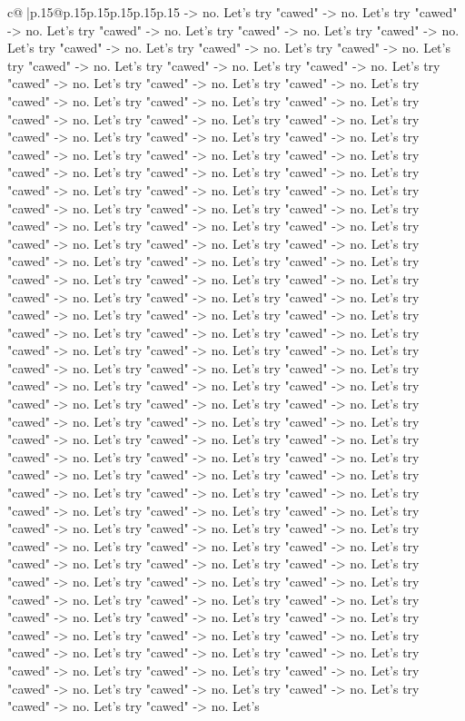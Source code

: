 \documentclass{article}
\begin{document}
{\begin{supertabular}{c@{$\;$}|p{.15\linewidth}@{}p{.15\linewidth}p{.15\linewidth}p{.15\linewidth}p{.15\linewidth}p{.15\linewidth}}
{{{{-}> no. Let's try "cawed" {-}> no. Let's try "cawed" {-}> no. Let's try "cawed" {-}> no. Let's try "cawed" {-}> no. Let's try "cawed" {-}> no. Let's try "cawed" {-}> no. Let's try "cawed" {-}> no. Let's try "cawed" {-}> no. Let's try "cawed" {-}> no. Let's try "cawed" {-}> no. Let's try "cawed" {-}> no. Let's try "cawed" {-}> no. Let's try "cawed" {-}> no. Let's try "cawed" {-}> no. Let's try "cawed" {-}> no. Let's try "cawed" {-}> no. Let's try "cawed" {-}> no. Let's try "cawed" {-}> no. Let's try "cawed" {-}> no. Let's try "cawed" {-}> no. Let's try "cawed" {-}> no. Let's try "cawed" {-}> no. Let's try "cawed" {-}> no. Let's try "cawed" {-}> no. Let's try "cawed" {-}> no. Let's try "cawed" {-}> no. Let's try "cawed" {-}> no. Let's try "cawed" {-}> no. Let's try "cawed" {-}> no. Let's try "cawed" {-}> no. Let's try "cawed" {-}> no. Let's try "cawed" {-}> no. Let's try "cawed" {-}> no. Let's try "cawed" {-}> no. Let's try "cawed" {-}> no. Let's try "cawed" {-}> no. Let's try "cawed" {-}> no. Let's try "cawed" {-}> no. Let's try "cawed" {-}> no. Let's try "cawed" {-}> no. Let's try "cawed" {-}> no. Let's try "cawed" {-}> no. Let's try "cawed" {-}> no. Let's try "cawed" {-}> no. Let's try "cawed" {-}> no. Let's try "cawed" {-}> no. Let's try "cawed" {-}> no. Let's try "cawed" {-}> no. Let's try "cawed" {-}> no. Let's try "cawed" {-}> no. Let's try "cawed" {-}> no. Let's try "cawed" {-}> no. Let's try "cawed" {-}> no. Let's try "cawed" {-}> no. Let's try "cawed" {-}> no. Let's try "cawed" {-}> no. Let's try "cawed" {-}> no. Let's try "cawed" {-}> no. Let's try "cawed" {-}> no. Let's try "cawed" {-}> no. Let's try "cawed" {-}> no. Let's try "cawed" {-}> no. Let's try "cawed" {-}> no. Let's try "cawed" {-}> no. Let's try "cawed" {-}> no. Let's try "cawed" {-}> no. Let's try "cawed" {-}> no. Let's try "cawed" {-}> no. Let's try "cawed" {-}> no. Let's try "cawed" {-}> no. Let's try "cawed" {-}> no. Let's try "cawed" {-}> no. Let's try "cawed" {-}> no. Let's try "cawed" {-}> no. Let's try "cawed" {-}> no. Let's try "cawed" {-}> no. Let's try "cawed" {-}> no. Let's try "cawed" {-}> no. Let's try "cawed" {-}> no. Let's try "cawed" {-}> no. Let's try "cawed" {-}> no. Let's try "cawed" {-}> no. Let's try "cawed" {-}> no. Let's try "cawed" {-}> no. Let's try "cawed" {-}> no. Let's try "cawed" {-}> no. Let's try "cawed" {-}> no. Let's try "cawed" {-}> no. Let's try "cawed" {-}> no. Let's try "cawed" {-}> no. Let's try "cawed" {-}> no. Let's try "cawed" {-}> no. Let's try "cawed" {-}> no. Let's try "cawed" {-}> no. Let's try "cawed" {-}> no. Let's try "cawed" {-}> no. Let's try "cawed" {-}> no. Let's try "cawed" {-}> no. Let's try "cawed" {-}> no. Let's try "cawed" {-}> no. Let's try "cawed" {-}> no. Let's try "cawed" {-}> no. Let's try "cawed" {-}> no. Let's try "cawed" {-}> no. Let's try "cawed" {-}> no. Let's try "cawed" {-}> no. Let's try "cawed" {-}> no. Let's try "cawed" {-}> no. Let's try "cawed" {-}> no. Let's try "cawed" {-}> no. Let's try "cawed" {-}> no. Let's try "cawed" {-}> no. Let's try "cawed" {-}> no. Let's try "cawed" {-}> no. Let's try "cawed" {-}> no. Let's try "cawed" {-}> no. Let's try "cawed" {-}> no. Let's try "cawed" {-}> no. Let's }}}
\end{supertabular}}
\end{document}
